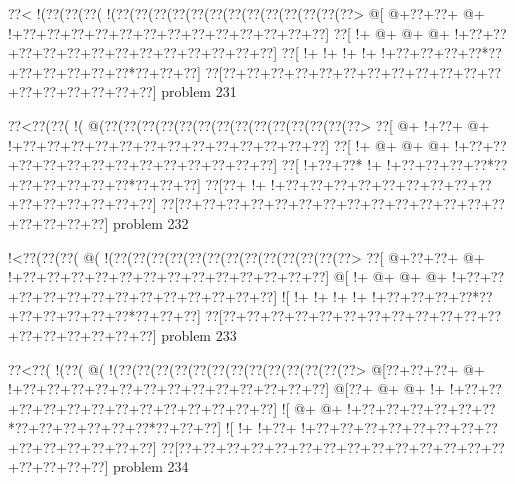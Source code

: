 \vbox{\vbox{\goo
\0??<\- !(\0??(\0??(\0??(\- !(\0??(\0??(\0??(\0??(\0??(\0??(\0??(\0??(\0??(\0??(\0??(\0??(\0??>
\- @[\- @+\0??+\0??+\- @+\- !+\0??+\0??+\0??+\0??+\0??+\0??+\0??+\0??+\0??+\0??+\0??+\0??+\0??]
\0??[\- !+\- @+\- @+\- @+\- !+\0??+\0??+\0??+\0??+\0??+\0??+\0??+\0??+\0??+\0??+\0??+\0??+\0??]
\0??[\- !+\- !+\- !+\- !+\- !+\0??+\0??+\0??+\0??*\0??+\0??+\0??+\0??+\0??+\0??*\0??+\0??+\0??]
\0??[\0??+\0??+\0??+\0??+\0??+\0??+\0??+\0??+\0??+\0??+\0??+\0??+\0??+\0??+\0??+\0??+\0??+\0??]
}
\hfil problem 231\hfil\break
}



\vbox{\vbox{\goo
\0??<\0??(\0??(\- !(\- @(\0??(\0??(\0??(\0??(\0??(\0??(\0??(\0??(\0??(\0??(\0??(\0??(\0??(\0??>
\0??[\- @+\- !+\0??+\- @+\- !+\0??+\0??+\0??+\0??+\0??+\0??+\0??+\0??+\0??+\0??+\0??+\0??+\0??]
\0??[\- !+\- @+\- @+\- @+\- !+\0??+\0??+\0??+\0??+\0??+\0??+\0??+\0??+\0??+\0??+\0??+\0??+\0??]
\0??[\- !+\0??+\0??*\- !+\- !+\0??+\0??+\0??+\0??*\0??+\0??+\0??+\0??+\0??+\0??*\0??+\0??+\0??]
\0??[\0??+\- !+\- !+\0??+\0??+\0??+\0??+\0??+\0??+\0??+\0??+\0??+\0??+\0??+\0??+\0??+\0??+\0??]
\0??[\0??+\0??+\0??+\0??+\0??+\0??+\0??+\0??+\0??+\0??+\0??+\0??+\0??+\0??+\0??+\0??+\0??+\0??]
}
\hfil problem 232\hfil\break
}



\vbox{\vbox{\goo
\- !<\0??(\0??(\0??(\- @(\- !(\0??(\0??(\0??(\0??(\0??(\0??(\0??(\0??(\0??(\0??(\0??(\0??(\0??>
\0??[\- @+\0??+\0??+\- @+\- !+\0??+\0??+\0??+\0??+\0??+\0??+\0??+\0??+\0??+\0??+\0??+\0??+\0??]
\- @[\- !+\- @+\- @+\- @+\- !+\0??+\0??+\0??+\0??+\0??+\0??+\0??+\0??+\0??+\0??+\0??+\0??+\0??]
\- ![\- !+\- !+\- !+\- !+\- !+\0??+\0??+\0??+\0??*\0??+\0??+\0??+\0??+\0??+\0??*\0??+\0??+\0??]
\0??[\0??+\0??+\0??+\0??+\0??+\0??+\0??+\0??+\0??+\0??+\0??+\0??+\0??+\0??+\0??+\0??+\0??+\0??]
}
\hfil problem 233\hfil\break
}



\vbox{\vbox{\goo
\0??<\0??(\- !(\0??(\- @(\- !(\0??(\0??(\0??(\0??(\0??(\0??(\0??(\0??(\0??(\0??(\0??(\0??(\0??>
\- @[\0??+\0??+\0??+\- @+\- !+\0??+\0??+\0??+\0??+\0??+\0??+\0??+\0??+\0??+\0??+\0??+\0??+\0??]
\- @[\0??+\- @+\- @+\- !+\- !+\0??+\0??+\0??+\0??+\0??+\0??+\0??+\0??+\0??+\0??+\0??+\0??+\0??]
\- ![\- @+\- @+\- !+\0??+\0??+\0??+\0??+\0??+\0??*\0??+\0??+\0??+\0??+\0??+\0??*\0??+\0??+\0??]
\- ![\- !+\- !+\0??+\- !+\0??+\0??+\0??+\0??+\0??+\0??+\0??+\0??+\0??+\0??+\0??+\0??+\0??+\0??]
\0??[\0??+\0??+\0??+\0??+\0??+\0??+\0??+\0??+\0??+\0??+\0??+\0??+\0??+\0??+\0??+\0??+\0??+\0??]
}
\hfil problem 234\hfil\break
}



